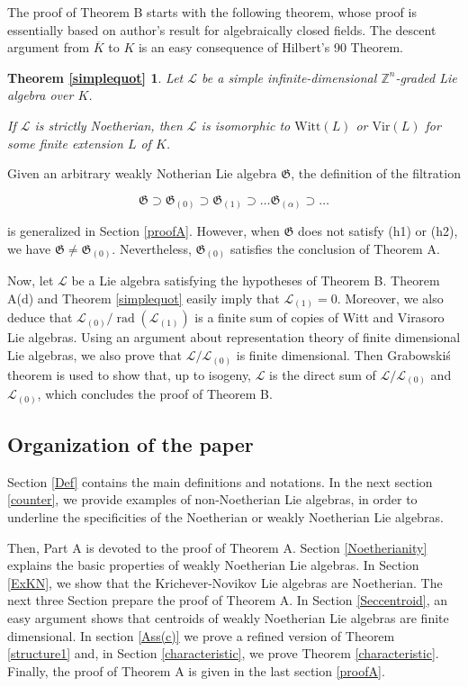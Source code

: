 \documentclass[11pt, letterpaper, reqno]{amsart}
\newtheorem*{simplequot}{Theorem \ref{simplequot}}
\theoremstyle{definition}
\newcommand{\rad}{\operatorname{rad}}
\newcommand{\Z}{{\mathbb Z}}
\newcommand{\cL}{\mathcal L}
\newcommand{\fG}{\mathfrak{G}}
\newcommand{\Vir}{\mathrm{Vir}}
\newcommand{\Witt}{\mathrm{Witt}}
\begin{document}
\bigskip
The proof of Theorem B starts with the following theorem,
whose proof is essentially based on author's result
\cite{Mathieu-jalg,Mathieu-inv1,Mathieu-inv2, AndMath} for
algebraically closed fields. The descent
argument  from $\overline{K}$ to $K$ is an easy
consequence of Hilbert's 90 Theorem. 

\begin{simplequot} Let $\cL$ be a simple
infinite-dimensional $\Z^n$-graded
Lie algebra over $K$. 

If $\cL$ is strictly Noetherian, 
then $\cL$ is isomorphic to
$\Witt(L)$ or $\Vir(L)$ for some 
finite extension $L$ of $K$.
\end{simplequot}

Given an arbitrary weakly  Notherian Lie algebra $\fG$, the 
definition of the filtration

$$\fG\supset \fG_{(0)}\supset \fG_{(1)}\supset \ldots\fG_{(\alpha)}\supset\ldots$$ 

\noindent is generalized in Section \ref{proofA}. However, when
$\fG$ does not satisfy (h1) or (h2), we have
$\fG\neq \fG_{(0)}$. Nevertheless, $\fG_{(0)}$ satisfies the conclusion of Theorem A.

Now, let $\cL$ be a Lie algebra satisfying the hypotheses of Theorem B. Theo\-rem A(d) and Theorem \ref{simplequot} easily imply that $\cL_{(1)}=0$. 
Moreover, we also deduce
that $\cL_{(0)}/\rad(\cL_{(1)})$ is  a finite sum
of copies of Witt and Virasoro Lie algebras.
Using an argument about representation theory of
finite dimensional Lie algebras, 
we also prove that $\cL/\cL_{(0)}$ is finite dimensional.
Then Grabowski\'s theorem  \cite{Grab2} is used to show that, up to isogeny, $\cL$ is the direct sum of
$\cL/\cL_{(0)}$ and $\cL_{(0)}$, which concludes the proof of Theorem B.





\subsection{Organization of the paper}
Section \ref{Def} contains the main definitions and 
notations. In the next section \ref{counter},
we provide examples of non-Noetherian Lie algebras, 
in order to underline the specificities of the Noetherian or weakly Noetherian Lie algebras.

Then, Part A is devoted to the proof of Theorem A.
Section \ref{Noetherianity} explains the basic properties of weakly Noetherian Lie algebras.
In Section \ref{ExKN}, we show that the Krichever-Novikov Lie algebras are Noetherian. 
The next three Section prepare  the
proof of Theorem A. In Section
\ref{Seccentroid}, an easy argument shows  that centroids of weakly Noetherian Lie algebras are finite dimensional. In section \ref{Ass(c)} we prove a refined version of Theorem \ref{structure1}
and, in Section \ref{characteristic},
we prove Theorem \ref{characteristic}.
Finally, the proof of Theorem A
is given in the last section \ref{proofA}.
\end{document}
